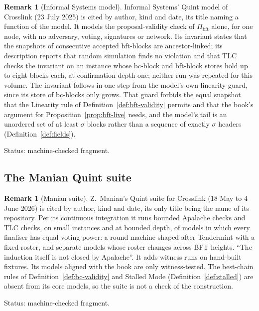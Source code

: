 \documentclass[11pt,a4paper]{article}
\theoremstyle{definition}
\newtheorem{remark}[theorem]{Remark}
\newcommand{\bft}{\mathrm{bft}}
\newcommand{\Pibft}{\Pi_{\bft}}
\begin{document}
\begin{remark}[Informal Systems model]\label{rem:mc-isq}
Informal Systems' Quint model of Crosslink (23 July 2025) is cited by
author, kind and date, its title naming a function of the model. It models
the proposal-validity check of $\Pibft$ alone, for one node, with no
adversary, voting, signatures or network. Its invariant states that the
snapshots of consecutive accepted bft-blocks are ancestor-linked; its
description reports that random simulation finds no violation and that TLC
checks the invariant on an instance whose bc-block and bft-block stores hold
up to eight blocks each, at confirmation depth one; neither run was repeated
for this volume. The invariant follows in one step from the model's own
linearity guard, since its store of bc-blocks only grows. That guard
forbids the equal snapshot that the Linearity rule of
Definition~\ref{def:bft-validity} permits and that the book's argument for
Proposition~\ref{prop:bft-live} needs, and the model's tail is an unordered
set of at least $\sigma$ blocks rather than a sequence of exactly $\sigma$
headers (Definition~\ref{def:fields}).

Status: machine-checked fragment.
\end{remark}

\subsection{The Manian Quint suite}\label{sec:mc-zq}

\begin{remark}[Manian suite]\label{rem:mc-zq}
Z.~Manian's Quint suite for Crosslink (18 May to 4 June 2026) is cited by
author, kind and date, its only title being the name of its repository. Per
its continuous integration it runs bounded Apalache checks and TLC checks, on
small instances and at bounded depth, of models in which every finaliser has
equal voting power: a round machine shaped after Tendermint with a fixed
roster, and separate models whose roster changes across BFT heights. ``The
induction itself is not closed by Apalache''. It adds witness runs on hand-built
fixtures. Its models aligned with the book are only witness-tested. The
best-chain rules of Definition~\ref{def:bc-validity} and Stalled Mode
(Definition~\ref{def:stalled}) are absent from its core models, so the suite
is not a check of the construction.

Status: machine-checked fragment.
\end{remark}
\end{document}
